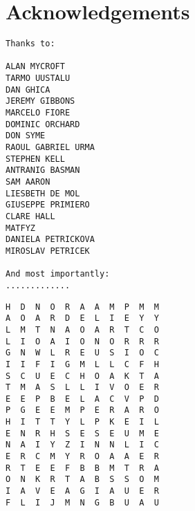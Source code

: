 

\chapter*{Acknowledgements} %

\thispagestyle{empty}


\vspace{5em}

\begin{minipage}{.45\textwidth}
\begin{verbatim}
Thanks to:

ALAN MYCROFT
TARMO UUSTALU
DAN GHICA
JEREMY GIBBONS
MARCELO FIORE
DOMINIC ORCHARD
DON SYME
RAOUL GABRIEL URMA
STEPHEN KELL
ANTRANIG BASMAN
SAM AARON
LIESBETH DE MOL
GIUSEPPE PRIMIERO
CLARE HALL
MATFYZ
DANIELA PETRICKOVA
MIROSLAV PETRICEK

And most importantly:
.............
\end{verbatim}
\end{minipage}
\begin{minipage}{.55\textwidth}
\begin{verbatim}
H  D  N  O  R  A  A  M  P  M  M 
A  O  A  R  D  E  L  I  E  Y  Y 
L  M  T  N  A  O  A  R  T  C  O 
L  I  O  A  I  O  N  O  R  R  R 
G  N  W  L  R  E  U  S  I  O  C 
I  I  F  I  G  M  L  L  C  F  H 
S  C  U  E  C  H  O  A  K  T  A 
T  M  A  S  L  L  I  V  O  E  R 
E  E  P  B  E  L  A  C  V  P  D 
P  G  E  E  M  P  E  R  A  R  O 
H  I  T  T  Y  L  P  K  E  I  L 
E  N  R  H  S  E  S  E  U  M  E 
N  A  I  Y  Z  I  N  N  L  I  C 
E  R  C  M  Y  R  O  A  A  E  R 
R  T  E  E  F  B  B  M  T  R  A 
O  N  K  R  T  A  B  S  S  O  M 
I  A  V  E  A  G  I  A  U  E  R 
F  L  I  J  M  N  G  B  U  A  U 
\end{verbatim}
\end{minipage}
